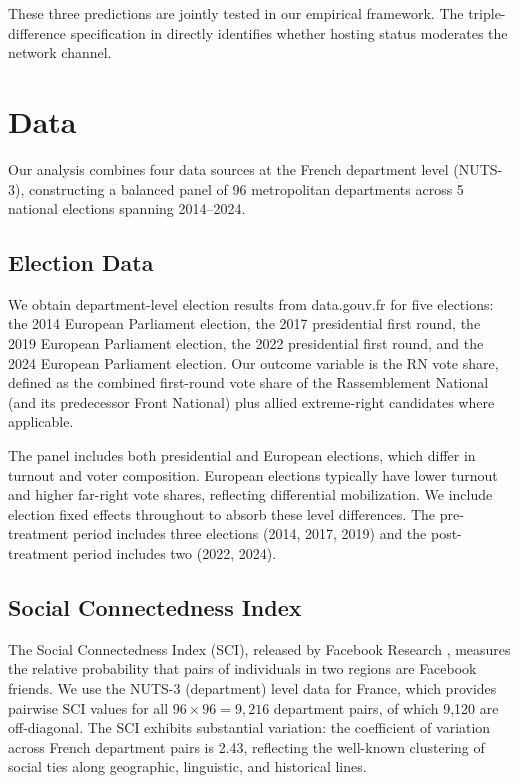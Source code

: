\documentclass[12pt]{article}
\begin{document}
These three predictions are jointly tested in our empirical framework. The triple-difference specification in  directly identifies whether hosting status moderates the network channel.

\section{Data}
\label{sec:data}

Our analysis combines four data sources at the French department level (NUTS-3), constructing a balanced panel of 96 metropolitan departments across 5 national elections spanning 2014--2024.

\subsection{Election Data}

We obtain department-level election results from data.gouv.fr for five elections: the 2014 European Parliament election, the 2017 presidential first round, the 2019 European Parliament election, the 2022 presidential first round, and the 2024 European Parliament election. Our outcome variable is the RN vote share, defined as the combined first-round vote share of the Rassemblement National (and its predecessor Front National) plus allied extreme-right candidates where applicable.

The panel includes both presidential and European elections, which differ in turnout and voter composition. European elections typically have lower turnout and higher far-right vote shares, reflecting differential mobilization. We include election fixed effects throughout to absorb these level differences. The pre-treatment period includes three elections (2014, 2017, 2019) and the post-treatment period includes two (2022, 2024).

\subsection{Social Connectedness Index}

The Social Connectedness Index (SCI), released by Facebook Research \citep{bailey2018social}, measures the relative probability that pairs of individuals in two regions are Facebook friends. We use the NUTS-3 (department) level data for France, which provides pairwise SCI values for all $96 \times 96 = 9{,}216$ department pairs, of which 9,120 are off-diagonal. The SCI exhibits substantial variation: the coefficient of variation across French department pairs is 2.43, reflecting the well-known clustering of social ties along geographic, linguistic, and historical lines.
\end{document}
